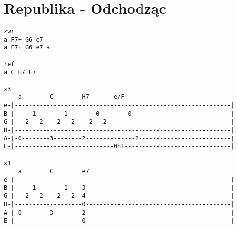 \section{Republika - Odchodząc}
\begin{verbatim}
zwr
a F7+ G6 e7
a F7+ G6 e7 a 

ref
a C H7 E7

x3
    a        C        H7       e/F
e-|-------------------------------------------------------------|
B-|-----1--------1--------0--------0----------------------------|
G-|---2---2----2---2----2---2-----------------------------------|
D-|-------------------------------------------------------------|
A-|-0--------3--------2--------------2--------------------------|
E-|----------------------------0h1------------------------------|

x1
    a        C        e7
e-|-------------------------------------------------------------|
B-|-----1--------1----3-----------------------------------------|
G-|---2---2----2---2--4-----------------------------------------|
D-|-------------------0-----------------------------------------|
A-|-0--------3--------2-----------------------------------------|
E-|-------------------0-----------------------------------------|
\end{verbatim}
\newpage


